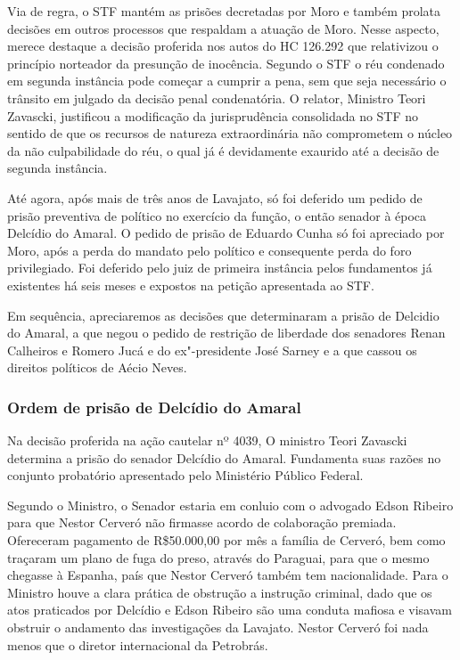 {Via de regra, o STF mantém as prisões decretadas por Moro e também
prolata decisões em outros processos que respaldam a atuação de Moro.
Nesse aspecto, merece destaque a decisão proferida nos autos do HC
126.292 que relativizou o princípio norteador da presunção de inocência.
Segundo o STF o réu condenado em segunda instância pode começar a
cumprir a pena, sem que seja necessário o trânsito em julgado da decisão
penal condenatória. O relator, Ministro Teori Zavascki, justificou a
modificação da jurisprudência consolidada no STF no sentido de que os
recursos de natureza extraordinária não comprometem o núcleo da não
culpabilidade do réu, o qual já é devidamente exaurido até a decisão de
segunda instância.

Até agora, após mais de três anos de Lavajato, só foi deferido um pedido
de prisão preventiva de político no exercício da função, o então senador
à época Delcídio do Amaral. O pedido de prisão de Eduardo Cunha só foi
apreciado por Moro, após a perda do mandato pelo político e consequente
perda do foro privilegiado. Foi deferido pelo juiz de primeira instância
pelos fundamentos já existentes há seis meses e expostos na petição
apresentada ao STF.

Em sequência, apreciaremos as decisões que determinaram a prisão de
Delcidio do Amaral, a que negou o pedido de restrição de liberdade dos
senadores Renan Calheiros e Romero Jucá e do ex"-presidente José Sarney e
a que cassou os direitos políticos de Aécio Neves.

\subsubsection{Ordem de prisão de Delcídio do Amaral}

Na decisão proferida na ação cautelar nº 4039, O ministro Teori Zavascki
determina a prisão do senador Delcídio do Amaral. Fundamenta suas razões
no conjunto probatório apresentado pelo Ministério Público Federal.

Segundo o Ministro, o Senador estaria em conluio com o advogado Edson
Ribeiro para que Nestor Cerveró não firmasse acordo de colaboração
premiada. Ofereceram pagamento de R\$50.000,00 por mês a família de
Cerveró, bem como traçaram um plano de fuga do preso, através do
Paraguai, para que o mesmo chegasse à Espanha, país que Nestor Cerveró
também tem nacionalidade. Para o Ministro houve a clara prática de
obstrução a instrução criminal, dado que os atos praticados por Delcídio
e Edson Ribeiro são uma conduta mafiosa e visavam obstruir o andamento
das investigações da Lavajato. Nestor Cerveró foi nada menos que o
diretor internacional da Petrobrás.

}
